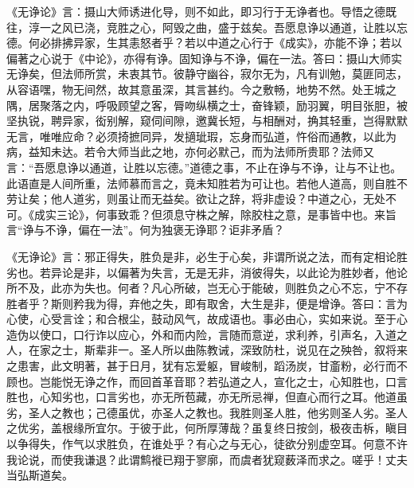 \documentclass[]{article}
\begin{document}
《无诤论》言：摄山大师诱进化导，则不如此，即习行于无诤者也。导悟之德既往，淳一之风已浇，竞胜之心，阿毁之曲，盛于兹矣。吾愿息诤以通道，让胜以忘德。何必排拂异家，生其恚怒者乎？若以中道之心行于《成实》，亦能不诤；若以偏著之心说于《中论》，亦得有诤。固知诤与不诤，偏在一法。答曰：摄山大师实无诤矣，但法师所赏，未衷其节。彼静守幽谷，寂尔无为，凡有训勉，莫匪同志，从容语嘿，物无间然，故其意虽深，其言甚约。今之敷畅，地势不然。处王城之隅，居聚落之内，呼吸顾望之客，脣吻纵横之士，奋锋颖，励羽翼，明目张胆，被坚执锐，聘异家，衒别解，窥伺间隙，邀冀长短，与相酬对，捔其轻重，岂得默默无言，唯唯应命？必须掎摭同异，发擿玼瑕，忘身而弘道，忤俗而通教，以此为病，益知未达。若令大师当此之地，亦何必默己，而为法师所贵耶？法师又言：``吾愿息诤以通道，让胜以忘德。''道德之事，不止在诤与不诤，让与不让也。此语直是人间所重，法师慕而言之，竟未知胜若为可让也。若他人道高，则自胜不劳让矣；他人道劣，则虽让而无益矣。欲让之辞，将非虚设？中道之心，无处不可。《成实三论》，何事致乖？但须息守株之解，除胶柱之意，是事皆中也。来旨言``诤与不诤，偏在一法''。何为独褒无诤耶？讵非矛盾？

《无诤论》言：邪正得失，胜负是非，必生于心矣，非谓所说之法，而有定相论胜劣也。若异论是非，以偏著为失言，无是无非，消彼得失，以此论为胜妙者，他论所不及，此亦为失也。何者？凡心所破，岂无心于能破，则胜负之心不忘，宁不存胜者乎？斯则矜我为得，弃他之失，即有取舍，大生是非，便是增诤。答曰：言为心使，心受言诠；和合根尘，鼓动风气，故成语也。事必由心，实如来说。至于心造伪以使口，口行诈以应心，外和而内险，言随而意逆，求利养，引声名，入道之人，在家之士，斯辈非一。圣人所以曲陈教诫，深致防杜，说见在之殃咎，叙将来之患害，此文明著，甚于日月，犹有忘爱躯，冒峻制，蹈汤炭，甘齑粉，必行而不顾也。岂能悦无诤之作，而回首革音耶？若弘道之人，宣化之士，心知胜也，口言胜也，心知劣也，口言劣也，亦无所苞藏，亦无所忌禅，但直心而行之耳。他道虽劣，圣人之教也；己德虽优，亦圣人之教也。我胜则圣人胜，他劣则圣人劣。圣人之优劣，盖根缘所宜尔。于彼于此，何所厚薄哉？虽复终日按剑，极夜击柝，瞋目以争得失，作气以求胜负，在谁处乎？有心之与无心，徒欲分别虚空耳。何意不许我论说，而使我谦退？此谓鹪褷已翔于寥廓，而虞者犹窥薮泽而求之。嗟乎！丈夫当弘斯道矣。
\end{document}
